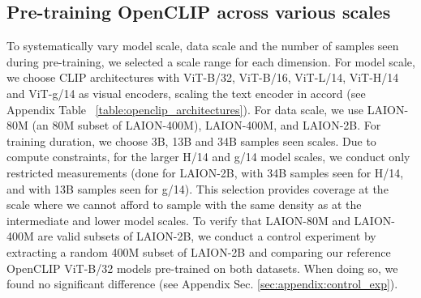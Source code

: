 \documentclass[11pt,table]{article}
\begin{document}


\subsection{Pre-training OpenCLIP across various scales}
\label{subsect:pretrain}

To systematically vary model scale, data scale and the number of samples seen during pre-training, we selected a scale range for each dimension. For model scale, we choose CLIP architectures with ViT-B/32, ViT-B/16, ViT-L/14, ViT-H/14 and ViT-g/14 as visual encoders, scaling the text encoder in accord (see Appendix Table ~\ref{table:openclip_architectures}). For data scale, we use LAION-80M (an 80M subset of LAION-400M), LAION-400M, and LAION-2B. For training duration, we choose 3B, 13B and 34B samples seen scales. Due to compute constraints, for the larger H/14 and g/14 model scales, we conduct only restricted measurements (done for LAION-2B, with 34B samples seen for H/14, and with 13B samples seen for g/14). This selection provides coverage at the scale where we cannot afford to sample with the same density as at the intermediate  and lower model scales. To verify that LAION-80M and LAION-400M are valid subsets of LAION-2B, we conduct a control experiment by extracting a random 400M subset of LAION-2B and comparing our reference OpenCLIP ViT-B/32 models pre-trained on both datasets. When doing so, we found no significant difference (see Appendix Sec. \ref{sec:appendix:control_exp}).
\end{document}
